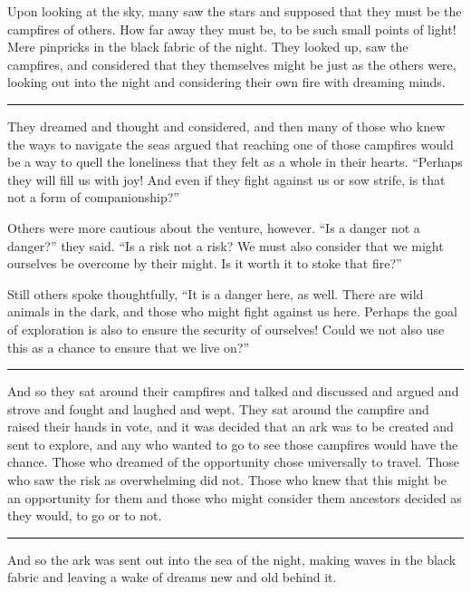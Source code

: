 Upon looking at the sky, many saw the stars and supposed that they must be the campfires of others. How far away they must be, to be such small points of light! Mere pinpricks in the black fabric of the night. They looked up, saw the campfires, and considered that they themselves might be just as the others were, looking out into the night and considering their own fire with dreaming minds.

\begin{center}\rule{0.5\linewidth}{0.5pt}\end{center}

They dreamed and thought and considered, and then many of those who knew the ways to navigate the seas argued that reaching one of those campfires would be a way to quell the loneliness that they felt as a whole in their hearts. ``Perhaps they will fill us with joy! And even if they fight against us or sow strife, is that not a form of companionship?''

Others were more cautious about the venture, however. ``Is a danger not a danger?'' they said. ``Is a risk not a risk? We must also consider that we might ourselves be overcome by their might. Is it worth it to stoke that fire?''

Still others spoke thoughtfully, ``It is a danger here, as well. There are wild animals in the dark, and those who might fight against us here. Perhaps the goal of exploration is also to ensure the security of ourselves! Could we not also use this as a chance to ensure that we live on?''

\begin{center}\rule{0.5\linewidth}{0.5pt}\end{center}

And so they sat around their campfires and talked and discussed and argued and strove and fought and laughed and wept. They sat around the campfire and raised their hands in vote, and it was decided that an ark was to be created and sent to explore, and any who wanted to go to see those campfires would have the chance. Those who dreamed of the opportunity chose universally to travel. Those who saw the risk as overwhelming did not. Those who knew that this might be an opportunity for them and those who might consider them ancestors decided as they would, to go or to not.

\begin{center}\rule{0.5\linewidth}{0.5pt}\end{center}

And so the ark was sent out into the sea of the night, making waves in the black fabric and leaving a wake of dreams new and old behind it.

